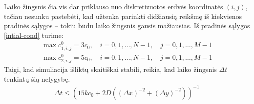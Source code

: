 Laiko žingsnis čia vis dar priklauso nuo diskretizuotos erdvės koordinatės $(i, j)$, tačiau nesunku pastebėti, kad užtenka parinkti didžiausią reikšmę iš kiekvienos pradinės sąlygos -- tokiu būdu laiko žingsnis gausis mažiausias. Iš pradinės sąlygos \eqref{intial-cond} turime:
\begin{align*}
\max c^0_{1,i,j}=3c_0,\quad i=0,1,\dots,N-1, \quad j=0,1,\dots,M-1\\
\max c^0_{2,i,j}=5c_0,\quad i=0,1,\dots,N-1, \quad j=0,1,\dots,M-1
\end{align*}
Taigi, kad simuliacija išliktų skaitiškai stabili, reikia, kad laiko žingsnis $\Delta t$ tenkintų šią nelygybę.
\begin{align}
  \Delta t \leqslant \left(15kc_0+2D\left((\Delta x)^{-2}+(\Delta y)^{-2}\right)\right)^{-1}\label{numerical-stability-condition}
\end{align}

